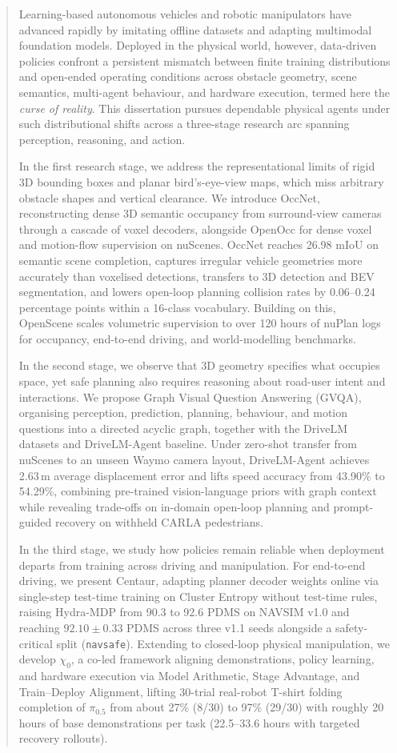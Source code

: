 \begin{abstract}

Learning-based autonomous vehicles and robotic manipulators have advanced rapidly by imitating offline datasets and adapting multimodal foundation models. Deployed in the physical world, however, data-driven policies confront a persistent mismatch between finite training distributions and open-ended operating conditions across obstacle geometry, scene semantics, multi-agent behaviour, and hardware execution, termed here the \emph{curse of reality}. This dissertation pursues dependable physical agents under such distributional shifts across a three-stage research arc spanning perception, reasoning, and action.

In the first research stage, we address the representational limits of rigid 3D bounding boxes and planar bird's-eye-view maps, which miss arbitrary obstacle shapes and vertical clearance. We introduce OccNet, reconstructing dense 3D semantic occupancy from surround-view cameras through a cascade of voxel decoders, alongside OpenOcc for dense voxel and motion-flow supervision on nuScenes. OccNet reaches 26.98 mIoU on semantic scene completion, captures irregular vehicle geometries more accurately than voxelised detections, transfers to 3D detection and BEV segmentation, and lowers open-loop planning collision rates by 0.06--0.24 percentage points within a 16-class vocabulary. Building on this, OpenScene scales volumetric supervision to over 120 hours of nuPlan logs for occupancy, end-to-end driving, and world-modelling benchmarks.

In the second stage, we observe that 3D geometry specifies what occupies space, yet safe planning also requires reasoning about road-user intent and interactions. We propose Graph Visual Question Answering (GVQA), organising perception, prediction, planning, behaviour, and motion questions into a directed acyclic graph, together with the DriveLM datasets and DriveLM-Agent baseline. Under zero-shot transfer from nuScenes to an unseen Waymo camera layout, DriveLM-Agent achieves 2.63\,m average displacement error and lifts speed accuracy from 43.90\% to 54.29\%, combining pre-trained vision-language priors with graph context while revealing trade-offs on in-domain open-loop planning and prompt-guided recovery on withheld CARLA pedestrians.

In the third stage, we study how policies remain reliable when deployment departs from training across driving and manipulation. For end-to-end driving, we present Centaur, adapting planner decoder weights online via single-step test-time training on Cluster Entropy without test-time rules, raising Hydra-MDP from 90.3 to 92.6 PDMS on NAVSIM v1.0 and reaching $92.10 \pm 0.33$ PDMS across three v1.1 seeds alongside a safety-critical split (\texttt{navsafe}). Extending to closed-loop physical manipulation, we develop $\chi_0$, a co-led framework aligning demonstrations, policy learning, and hardware execution via Model Arithmetic, Stage Advantage, and Train--Deploy Alignment, lifting 30-trial real-robot T-shirt folding completion of $\pi_{0.5}$ from about 27\% (8/30) to 97\% (29/30) with roughly 20 hours of base demonstrations per task (22.5--33.6 hours with targeted recovery rollouts).


\end{abstract}
